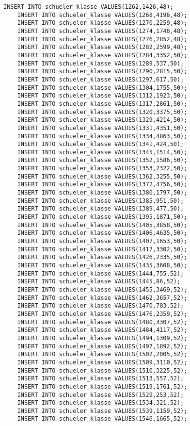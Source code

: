 \begin{lstlisting}[breaklines=True, numbers=none, basicstyle=\tiny, keepspaces=false]
	INSERT INTO schueler_klasse VALUES(1262,1426,48);
	INSERT INTO schueler_klasse VALUES(1268,4196,48);
	INSERT INTO schueler_klasse VALUES(1270,2259,48);
	INSERT INTO schueler_klasse VALUES(1274,1748,48);
	INSERT INTO schueler_klasse VALUES(1276,2852,48);
	INSERT INTO schueler_klasse VALUES(1282,2599,48);
	INSERT INTO schueler_klasse VALUES(1284,3352,50);
	INSERT INTO schueler_klasse VALUES(1289,537,50);
	INSERT INTO schueler_klasse VALUES(1290,2815,50);
	INSERT INTO schueler_klasse VALUES(1297,617,50);
	INSERT INTO schueler_klasse VALUES(1304,1755,50);
	INSERT INTO schueler_klasse VALUES(1312,1923,50);
	INSERT INTO schueler_klasse VALUES(1317,2861,50);
	INSERT INTO schueler_klasse VALUES(1320,3375,50);
	INSERT INTO schueler_klasse VALUES(1329,4214,50);
	INSERT INTO schueler_klasse VALUES(1331,4351,50);
	INSERT INTO schueler_klasse VALUES(1334,4863,50);
	INSERT INTO schueler_klasse VALUES(1341,424,50);
	INSERT INTO schueler_klasse VALUES(1345,1514,50);
	INSERT INTO schueler_klasse VALUES(1352,1586,50);
	INSERT INTO schueler_klasse VALUES(1353,2322,50);
	INSERT INTO schueler_klasse VALUES(1362,3255,50);
	INSERT INTO schueler_klasse VALUES(1372,4756,50);
	INSERT INTO schueler_klasse VALUES(1380,1797,50);
	INSERT INTO schueler_klasse VALUES(1385,951,50);
	INSERT INTO schueler_klasse VALUES(1389,477,50);
	INSERT INTO schueler_klasse VALUES(1395,1871,50);
	INSERT INTO schueler_klasse VALUES(1405,3858,50);
	INSERT INTO schueler_klasse VALUES(1406,4635,50);
	INSERT INTO schueler_klasse VALUES(1407,1653,50);
	INSERT INTO schueler_klasse VALUES(1417,3302,50);
	INSERT INTO schueler_klasse VALUES(1426,2335,50);
	INSERT INTO schueler_klasse VALUES(1435,3608,50);
	INSERT INTO schueler_klasse VALUES(1444,755,52);
	INSERT INTO schueler_klasse VALUES(1445,86,52);
	INSERT INTO schueler_klasse VALUES(1455,3469,52);
	INSERT INTO schueler_klasse VALUES(1462,3657,52);
	INSERT INTO schueler_klasse VALUES(1470,703,52);
	INSERT INTO schueler_klasse VALUES(1476,2359,52);
	INSERT INTO schueler_klasse VALUES(1480,3307,52);
	INSERT INTO schueler_klasse VALUES(1484,4117,52);
	INSERT INTO schueler_klasse VALUES(1494,1309,52);
	INSERT INTO schueler_klasse VALUES(1497,1892,52);
	INSERT INTO schueler_klasse VALUES(1502,2005,52);
	INSERT INTO schueler_klasse VALUES(1509,3110,52);
	INSERT INTO schueler_klasse VALUES(1510,3225,52);
	INSERT INTO schueler_klasse VALUES(1513,557,52);
	INSERT INTO schueler_klasse VALUES(1519,1761,52);
	INSERT INTO schueler_klasse VALUES(1529,253,52);
	INSERT INTO schueler_klasse VALUES(1534,321,52);
	INSERT INTO schueler_klasse VALUES(1539,1159,52);
	INSERT INTO schueler_klasse VALUES(1546,1665,52);

\end{lstlisting}

